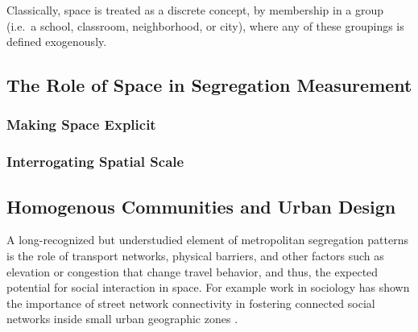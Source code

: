 \documentclass[
  10pt,
]{article}
\begin{document}
Classically, space is treated as a discrete concept, by membership in a
group (i.e.~a school, classroom, neighborhood, or city), where any of
these groupings is defined exogenously.

\hypertarget{the-role-of-space-in-segregation-measurement}{%
\subsection{The Role of Space in Segregation
Measurement}\label{the-role-of-space-in-segregation-measurement}}

\hypertarget{making-space-explicit}{%
\subsubsection{Making Space Explicit}\label{making-space-explicit}}

\citet{reardon2004MeasuresSpatial} \citet{reardon2009RaceSpace}
\citet{wong1997SpatialDependency} \citet{bailey2012HowSpatial}
\citet{rey2011ImpactSpatial} \citet{osullivan2007SurfaceBasedApproach}
\citet{wong2004ComparingTraditional} \citet{dawkins2004MeasuringSpatial}

\hypertarget{interrogating-spatial-scale}{%
\subsubsection{Interrogating Spatial
Scale}\label{interrogating-spatial-scale}}

\citet{lee2008CensusTract} \citet{reardon2008GeographicScale}
\citet{bezenac2022MeasuringVisualizing}
\citet{olteanu2019SegregationMultiscalar} \citet{osth2015MeasuringScale}
\citet{clark2015MultiscalarAnalysis}

\hypertarget{homogenous-communities-and-urban-design}{%
\subsection{Homogenous Communities and Urban
Design}\label{homogenous-communities-and-urban-design}}

A long-recognized but understudied element of metropolitan segregation
patterns is the role of transport networks, physical barriers, and other
factors such as elevation or congestion that change travel behavior, and
thus, the expected potential for social interaction in space. For
example work in sociology has shown the importance of street network
connectivity in fostering connected social networks inside small urban
geographic zones \citep{grannis1998ImportanceTrivial}.
\end{document}
